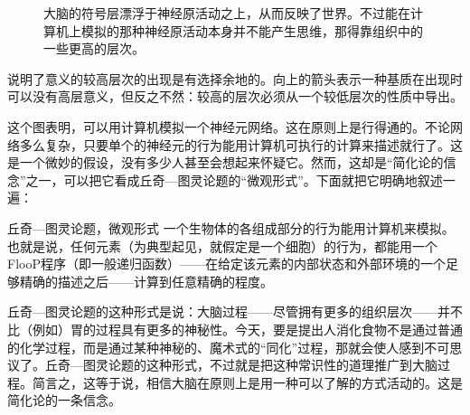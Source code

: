 \begin{figure}
\caption[大脑中的神经和符号活动。]
  {大脑的符号层漂浮于神经原活动之上，从而反映了世界。不过能在计算机上模拟的那种神经原活动本身并不能产生思维，那得靠组织中的一些更高的层次。}
\end{figure}

说明了意义的较高层次的出现是有选择余地的。向上的箭头表示一种基质在出现时可以没有高层意义，但反之不然：较高的层次必须从一个较低层次的性质中导出。

这个图表明，可以用计算机模拟一个神经元网络。这在原则上是行得通的。不论网络多么复杂，只要单个的神经元的行为能用计算机可执行的计算来描述就行了。这是一个微妙的假设，没有多少人甚至会想起来怀疑它。然而，这却是“简化论的信念”之一，可以把它看成丘奇—图灵论题的“微观形式”。下面就把它明确地叙述一遍：

\begin{thm}[2\ccwd]{丘奇—图灵论题，微观形式}
一个生物体的各组成部分的行为能用计算机来模拟。也就是说，任何元素（为典型起见，就假定是一个细胞）的行为，都能用一个FlooP程序（即一般递归函数）——在给定该元素的内部状态和外部环境的一个足够精确的描述之后——计算到任意精确的程度。
\end{thm}

丘奇—图灵论题的这种形式是说：大脑过程——尽管拥有更多的组织层次——并不比（例如）胃的过程具有更多的神秘性。今天，要是提出人消化食物不是通过普通的化学过程，而是通过某种神秘的、魔术式的“同化”过程，那就会使人感到不可思议了。丘奇—图灵论题的这种形式，不过就是把这种常识性的道理推广到大脑过程。简言之，这等于说，相信大脑在原则上是用一种可以了解的方式活动的。这是简化论的一条信念。

